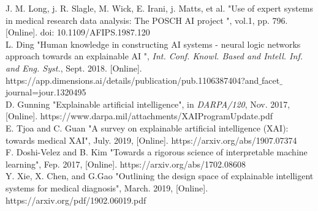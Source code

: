 \documentclass[12]{article}
\begin{document}
\begin{thebibliography}{1}
       J. M. Long, j. R. Slagle, M. Wick, E. Irani, j. Matts, et al. "Use of expert systems in medical research data analysis: The POSCH AI project ", vol.1, pp. 796. [Online]. doi: 10.1109/AFIPS.1987.120\\
  
         L. Ding "Human knowledge in constructing AI systems - neural logic
networks approach towards an explainable AI ", \textit{Int. Conf. Knowl. Based and Intell. Inf. and Eng. Syst.}, Sept. 2018. [Online]. https://app.dimensions.ai/details/publication/pub.1106387404?and$\_$facet$\_$journal=jour.1320495\\
  
        D. Gunning "Explainable artificial intelligence",  in \textit{DARPA/120}, Nov. 2017, [Online]. https://www.darpa.mil/attachments/XAIProgramUpdate.pdf\\
  
  
           E. Tjoa and C. Guan "A survey on explainable artificial intelligence (XAI): towards medical XAI", July. 2019, [Online]. https://arxiv.org/abs/1907.07374\\
  
  
             F. Doshi-Velez and B. Kim "Towards a rigorous science of interpretable machine learning", Fep. 2017, [Online]. https://arxiv.org/abs/1702.08608\\
  
               Y. Xie, X. Chen, and G.Gao "Outlining the design space of explainable intelligent systems for medical diagnosis", March. 2019, [Online]. https://arxiv.org/pdf/1902.06019.pdf\\
  
  

  \end{thebibliography}
\end{document}
